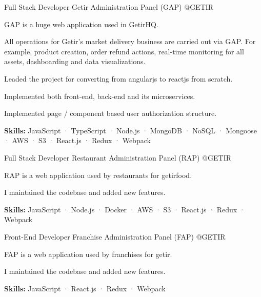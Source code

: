 \begin{cventries}
  \cventry
    {Full Stack Developer} %
    {Getir Administration Panel (GAP)} %
    {@GETIR} %
    {}
    {
      \begin{cvitems} %
        \item {GAP is a huge web application used in GetirHQ.}
        \item {All operations for Getir's market delivery business are carried out via GAP. For example, product creation, order refund actions, real-time monitoring for all assets, dashboarding and data visualizations.}
        \item {Leaded the project for converting from angularjs to reactjs from scratch.}
        \item {Implemented both front-end, back-end and its microservices.}
        \item {Implemented page / component based user authorization structure.}
        \item {\textbf {Skills:} JavaScript · TypeScript · Node.js · MongoDB · NoSQL · Mongoose · AWS · S3 · React.js · Redux · Webpack}
      \end{cvitems}
    }

  \cventry
    {Full Stack Developer} %
    {Restaurant Administration Panel (RAP)} %
    {@GETIR} %
    {}
    {
      \begin{cvitems} %
        \item {RAP is a web application used by restaurants for getirfood.}
        \item {I maintained the codebase and added new features.}
        \item {\textbf {Skills:} JavaScript · Node.js · Docker · AWS · S3 · React.js · Redux · Webpack}
      \end{cvitems}
    }

  \cventry
    {Front-End Developer} %
    {Franchise Administration Panel (FAP)} %
    {@GETIR} %
    {}
    {
      \begin{cvitems} %
        \item {FAP is a web application used by franchises for getir.}
        \item {I maintained the codebase and added new features.}
        \item {\textbf {Skills:} JavaScript · React.js · Redux · Webpack}
      \end{cvitems}
    }


\end{cventries}
